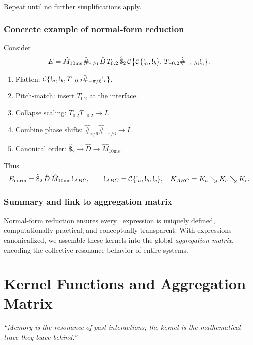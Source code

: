 Repeat until no further simplifications apply.

\subsubsection{Concrete example of normal-form reduction}

Consider
\[
  E = \hat{M}_{10\mathrm{ms}}\,
      \hat{\#}_{\pi/6}\,
      \hat{D}\,
      T_{0.2}\,
      \hat{\$}_{2}\,
      \mathcal{C}\bigl\{\mathcal{C}\{\mathsf{!}_{a},\mathsf{!}_{b}\},\,T_{-0.2}\hat{\#}_{-\pi/6}\mathsf{!}_{c}\bigr\}.
\]
\begin{enumerate}[leftmargin=1.5em]
  \item Flatten: \(\mathcal{C}\{\mathsf{!}_{a},\mathsf{!}_{b},T_{-0.2}\hat{\#}_{-\pi/6}\mathsf{!}_{c}\}\).
  \item Pitch-match: insert \(T_{0.2}\) at the interface.
  \item Collapse scaling: \(T_{0.2}T_{-0.2}\to I\).
  \item Combine phase shifts: \(\hat{\#}_{\pi/6}\hat{\#}_{-\pi/6}\to I\).
  \item Canonical order: \(\hat{\$}_{2}\to \hat{D}\to \hat{M}_{10\mathrm{ms}}\).
\end{enumerate}
Thus
\[
  E_{\mathrm{norm}}
  = \hat{\$}_{2}\,\hat{D}\,\hat{M}_{10\mathrm{ms}}\,\mathsf{!}_{ABC},
  \qquad
  \mathsf{!}_{ABC}=\mathcal{C}\{\mathsf{!}_{a},\mathsf{!}_{b},\mathsf{!}_{c}\},
  \quad
  K_{ABC} = K_a\searrow K_b\searrow K_c.
\]

\subsubsection{Summary and link to aggregation matrix}

Normal-form reduction ensures every \RCM\ expression is uniquely defined, computationally practical, and conceptually transparent. With expressions canonicalized, we assemble these kernels into the global \emph{aggregation matrix}, encoding the collective resonance behavior of entire systems.

\section{Kernel Functions and Aggregation Matrix}

\begin{center}
\emph{“Memory is the resonance of past interactions; the kernel is the mathematical trace they leave behind.”}
\end{center}

